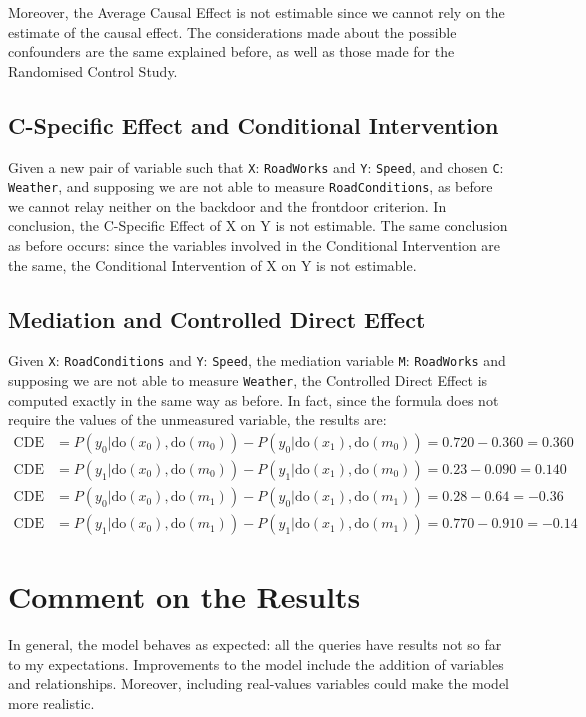\documentclass[a4paper,12pt]{article} %
\begin{document}
Moreover, the Average Causal Effect is not estimable since we cannot rely on the estimate of the causal effect. The considerations made about the possible confounders are the same explained before, as well as those made for the Randomised Control Study.

\subsection*{C-Specific Effect and Conditional Intervention}
Given a new pair of variable such that \texttt{X}: \texttt{RoadWorks} and \texttt{Y}: \texttt{Speed}, and chosen \texttt{C}: \texttt{Weather}, and supposing we are not able to measure \texttt{RoadConditions}, as before we cannot relay neither on the backdoor and the frontdoor criterion. In conclusion, the C-Specific Effect of X on Y is not estimable.
The same conclusion as before occurs: since the variables involved in the Conditional Intervention are the same, the Conditional Intervention of X on Y is not estimable.

\subsection*{Mediation and Controlled Direct Effect}
Given \texttt{X}: \texttt{RoadConditions} and \texttt{Y}: \texttt{Speed}, the mediation variable \texttt{M}: \texttt{RoadWorks} and supposing we are not able to measure \texttt{Weather}, the Controlled Direct Effect is computed exactly in the same way as before. In fact, since the formula does not require the values of the unmeasured variable, the results are:
\begin{equation*}
\begin{aligned}
\text{CDE} &= P(y_0|\mathrm{do}(x_0),\mathrm{do}(m_0)) - P(y_0|\mathrm{do}(x_1),\mathrm{do}(m_0)) = 0.720 - 0.360 = 0.360\\
\text{CDE} &= P(y_1|\mathrm{do}(x_0),\mathrm{do}(m_0)) - P(y_1|\mathrm{do}(x_1),\mathrm{do}(m_0))= 0.23 - 0.090 = 0.140\\
\text{CDE} &= P(y_0|\mathrm{do}(x_0),\mathrm{do}(m_1)) - P(y_0|\mathrm{do}(x_1),\mathrm{do}(m_1))=0.28 - 0.64 = -0.36\\
\text{CDE} &= P(y_1|\mathrm{do}(x_0),\mathrm{do}(m_1)) - P(y_1|\mathrm{do}(x_1),\mathrm{do}(m_1))=0.770 - 0.910 = -0.14
\end{aligned}
\end{equation*}

\section{Comment on the Results}
In general, the model behaves as expected: all the queries have results not so far to my expectations.  
Improvements to the model include the addition of variables and relationships. Moreover, including real-values variables could make the model more realistic.
\end{document}
